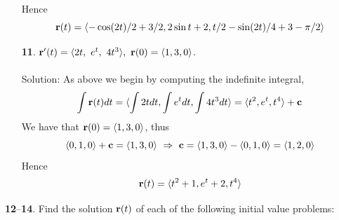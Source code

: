 \documentclass[12pt]{amsbook}
\newcommand{\la}{\langle}
\newcommand{\ra}{\rangle}
\begin{document}
\begin{enumerate}
   Hence
  $${\bf r}(t)=\la -\cos(2t)/2+3/2,2\sin t+2,t/2-\sin(2t)/4 +3-\pi/2 \ra$$
  \item[{\small\bf 11}.] ${\bf r}'(t)=\la 2t,\ e^t,\ 4t^3 \ra, \ {\bf r}(0)=\la 1,3,0 \ra$.
  \\
  \\
  {\sc Solution}: As above we begin by computing the indefinite integral,
  $$\int {\bf r}(t)dt=\la \int 2t dt, \int e^tdt, \int 4t^3 dt\ra = \la t^2,e^t,t^4 \ra +{\bf c}$$
  We have that ${\bf r}(0)=\la 1,3,0 \ra$, thus
  $$\la 0,1,0 \ra + {\bf c}= \la 1,3,0 \ra \ \Rightarrow \ {\bf c}=\la 1,3,0 \ra - \la 0,1,0 \ra = \la 1,2,0 \ra$$
   Hence
  $${\bf r}(t)=\la t^2+1,e^t+2,t^4 \ra$$
\end{enumerate}

\noindent
{\small {\bf 12}--{\bf 14}}. Find the solution ${\bf r}(t)$ of each of the following initial value problems:
\end{document}
